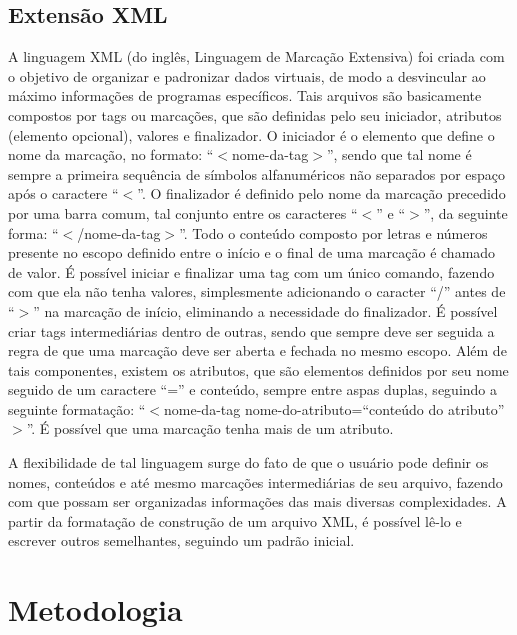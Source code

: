 \documentclass[conference]{IEEEtran}
\begin{document}
\subsection{Extensão XML}
A linguagem XML (do inglês, Linguagem de Marcação Extensiva) foi criada com o objetivo de organizar e padronizar dados virtuais, de modo a desvincular ao máximo informações de programas específicos. Tais arquivos são basicamente compostos por tags ou marcações, que são definidas pelo seu iniciador, atributos (elemento opcional), valores e finalizador. O iniciador é o elemento que define o nome da marcação, no formato: ``$<$nome-da-tag$>$'', sendo que tal nome é sempre a primeira sequência de símbolos alfanuméricos não separados por espaço após o caractere ``$<$''. O finalizador é definido pelo nome da marcação precedido por uma barra comum, tal conjunto entre os caracteres ``$<$'' e ``$>$'', da seguinte forma: ``$<$/nome-da-tag$>$''. Todo o conteúdo composto por letras e números presente no escopo definido entre o início e o final de uma marcação é chamado de valor. É possível iniciar e finalizar uma tag com um único comando, fazendo com que ela não tenha valores, simplesmente adicionando o caracter ``/'' antes de ``$>$'' na marcação de início, eliminando a necessidade do finalizador. É possível criar tags intermediárias dentro de outras, sendo que sempre deve ser seguida a regra de que uma marcação deve ser aberta e fechada no mesmo escopo. Além de tais componentes, existem os atributos, que são elementos definidos por seu nome seguido de um caractere ``='' e conteúdo, sempre entre aspas duplas, seguindo a seguinte formatação: ``$<$nome-da-tag nome-do-atributo=``conteúdo do atributo''$>$''. É possível que uma marcação tenha mais de um atributo.

A flexibilidade de tal linguagem surge do fato de que o usuário pode definir os nomes, conteúdos e até mesmo marcações intermediárias de seu arquivo, fazendo com que possam ser organizadas informações das mais diversas complexidades. A partir da formatação de construção de um arquivo XML, é possível lê-lo e escrever outros semelhantes, seguindo um padrão inicial. 




\section{Metodologia}
\end{document}
